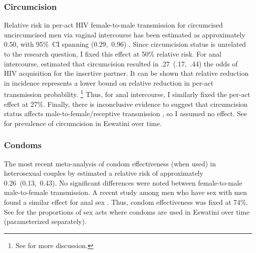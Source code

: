 \subsubsection{Circumcision}\label{model.par.beta.circ}
Relative risk in per-act HIV female-to-male transmission for circumcised \vs uncircumcised men
via vaginal intercourse has been estimated as
approximately 0.50, with 95\%~CI spanning (0.29,~0.96) \cite{Boily2009,Hughes2012,Patel2014}.
Since circumcision status is unrelated to the research question,
I fixed this effect at 50\% relative risk.
For anal intercourse, \citet{Wiysonge2011} estimated that circumcision resulted in
.27~(.17,~.44) the odds of HIV acquisition for the insertive partner.
It can be shown that relative reduction in incidence represents a lower bound
on relative reduction in per-act transmission probability.%
\footnote{See  for more discussion.}
Thus, for anal intercourse, I similarly fixed the per-act effect at 27\%.
Finally, there is inconclusive evidence to suggest that circumcision status affects
male-to-female/receptive transmission \cite{Weiss2009,Wiysonge2011}, so I assumed no effect.
See  for prevalence of circumcision in Eswatini over time.
\subsubsection{Condoms}\label{model.par.beta.condom}
The most recent meta-analysis of condom effectiveness (when used) in heterosexual couples
by \citet{Giannou2016} estimated a relative risk of approximately 0.26~(0.13,~0.43).
No significant differences were noted between female-to-male \vs male-to-female transmission.
A recent study among men who have sex with men found
a similar effect for anal sex \cite{Smith2015}.
Thus, condom effectiveness was fixed at 74\%.
See  for the proportions of sex acts where condoms are used
in Eswatini over time (parameterized separately).
